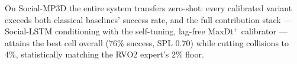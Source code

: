 On Social-MP3D the entire system transfers zero-shot: every calibrated
variant exceeds both classical baselines' success rate, and the full
contribution stack --- Social-LSTM conditioning with the self-tuning,
lag-free MaxDt$^{+}$ calibrator --- attains the best cell overall (76\%
success, SPL 0.70) while cutting collisions to 4\%, statistically matching
the RVO2 expert's 2\% floor.
